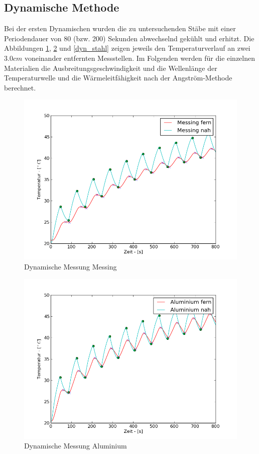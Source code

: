 \documentclass[11pt]{article}
\begin{document}
\subsection{Dynamische Methode}
Bei der ersten Dynamischen wurden die zu untersuchenden St\"abe mit einer Periodendauer von 80 (bzw. 200)  Sekunden abwechselnd gek\"uhlt und erhitzt. Die Abbildungen \ref{dyn_messing}, \ref{dyn_alu} und \ref{dyn_stahl} zeigen jeweils den Temperaturverlauf an zwei 3.0$cm$ voneinander entfernten Messstellen. Im Folgenden werden f\"ur die einzelnen Materialien die Ausbreitungsgeschwindigkeit und die Wellenl\"ange der Temperaturwelle und die W\"armeleitf\"ahigkeit nach der Angstr\"om-Methode berechnet.

\begin{figure}[P]
\centering
\includegraphics[width=\textwidth]{Diagramme/dyn_messing.png}
\caption{Dynamische Messung Messing}
\label{dyn_messing}
\end{figure}
\begin{figure}[P]
\centering
\includegraphics[width=\textwidth]{Diagramme/dyn_alu.png}
\caption{Dynamische Messung Aluminium}
\label{dyn_alu}
\end{figure}
\end{document}
